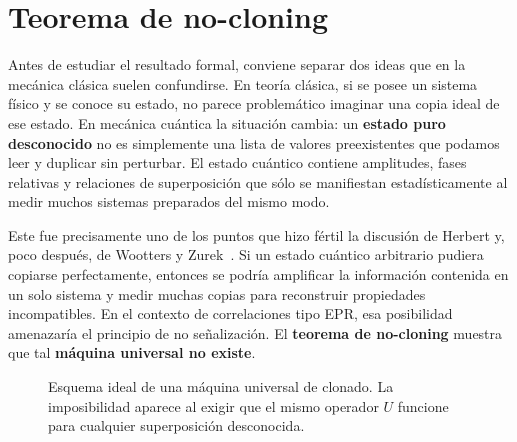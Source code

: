 \documentclass[12pt,a4paper]{article}
\theoremstyle{definition}
\theoremstyle{plain}
\theoremstyle{remark}
\begin{document}
\newpage

\section{Teorema de no-cloning}

Antes de estudiar el resultado formal, conviene separar dos ideas que en la mecánica clásica suelen confundirse. En teoría clásica, si se posee un sistema físico y se conoce su estado, no parece problemático imaginar una copia ideal de ese estado. En mecánica cuántica la situación cambia: un \textbf{estado puro desconocido} no es simplemente una lista de valores preexistentes que podamos leer y duplicar sin perturbar. El estado cuántico contiene amplitudes, fases relativas y relaciones de superposición que sólo se manifiestan estadísticamente al medir muchos sistemas preparados del mismo modo.

Este fue precisamente uno de los puntos que hizo fértil la discusión de Herbert y, poco después, de Wootters y Zurek~\cite{HerbertFLASH,WoottersZurek1982}. Si un estado cuántico arbitrario pudiera copiarse perfectamente, entonces se podría amplificar la información contenida en un solo sistema y medir muchas copias para reconstruir propiedades incompatibles. En el contexto de correlaciones tipo EPR, esa posibilidad amenazaría el principio de no señalización. El \textbf{teorema de no-cloning} muestra que tal \textbf{máquina universal no existe}.

\begin{figure}[htbp]
    \centering
    \caption{Esquema ideal de una máquina universal de clonado. La imposibilidad aparece al exigir que el mismo operador $U$ funcione para cualquier superposición desconocida.}
    \label{fig:maquina-no-cloning}
\end{figure}
\end{document}
